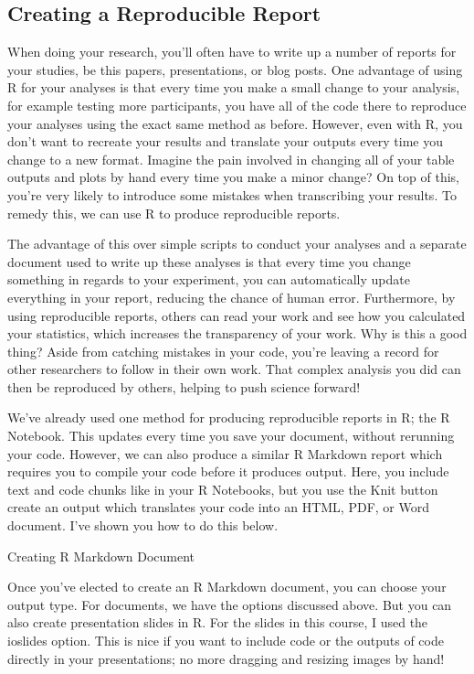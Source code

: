 \documentclass[
]{book}
\begin{document}
\hypertarget{creating-a-reproducible-report}{%
\subsection{Creating a Reproducible Report}\label{creating-a-reproducible-report}}

When doing your research, you'll often have to write up a number of reports for your studies, be this papers, presentations, or blog posts. One advantage of using R for your analyses is that every time you make a small change to your analysis, for example testing more participants, you have all of the code there to reproduce your analyses using the exact same method as before. However, even with R, you don't want to recreate your results and translate your outputs every time you change to a new format. Imagine the pain involved in changing all of your table outputs and plots by hand every time you make a minor change? On top of this, you're very likely to introduce some mistakes when transcribing your results. To remedy this, we can use R to produce reproducible reports.

The advantage of this over simple scripts to conduct your analyses and a separate document used to write up these analyses is that every time you change something in regards to your experiment, you can automatically update everything in your report, reducing the chance of human error. Furthermore, by using reproducible reports, others can read your work and see how you calculated your statistics, which increases the transparency of your work. Why is this a good thing? Aside from catching mistakes in your code, you're leaving a record for other researchers to follow in their own work. That complex analysis you did can then be reproduced by others, helping to push science forward!

We've already used one method for producing reproducible reports in R; the R Notebook. This updates every time you save your document, without rerunning your code. However, we can also produce a similar R Markdown report which requires you to compile your code before it produces output. Here, you include text and code chunks like in your R Notebooks, but you use the Knit button create an output which translates your code into an HTML, PDF, or Word document. I've shown you how to do this below.

Creating R Markdown Document

Once you've elected to create an R Markdown document, you can choose your output type. For documents, we have the options discussed above. But you can also create presentation slides in R. For the slides in this course, I used the ioslides option. This is nice if you want to include code or the outputs of code directly in your presentations; no more dragging and resizing images by hand!
\end{document}
